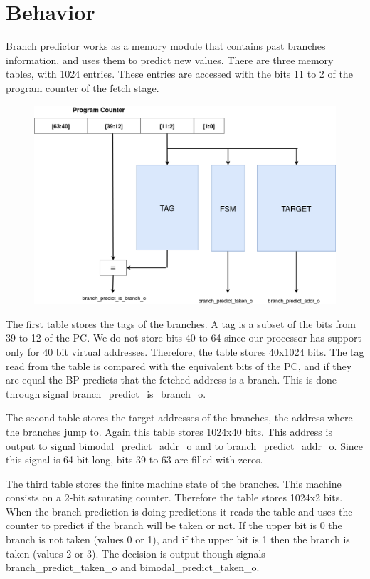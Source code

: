 \section{Behavior}

Branch predictor works as a memory module that contains past branches information, and uses them to predict new values. There are three memory tables, with 1024 entries. These entries are accessed with the bits 11 to 2 of the program counter of the fetch stage. 

\begin{figure}[h]
\centering
\includegraphics[width=1\linewidth]{branch_predictor.png}
\end{figure}

The first table stores the tags of the branches. A tag is a subset of the bits from 39 to 12 of the PC. We do not store bits 40 to 64 since our processor has support only for 40 bit virtual addresses. Therefore, the table stores 40x1024 bits. The tag read from the table is compared with the equivalent bits of the PC, and if they are equal the BP predicts that the fetched address is a branch. This is done through signal branch\_predict\_is\_branch\_o.

The second table stores the target addresses of the branches, the address where the branches jump to. Again this table stores 1024x40 bits. This address is output to signal bimodal\_predict\_addr\_o and to branch\_predict\_addr\_o. Since this signal is 64 bit long, bits 39 to 63 are filled with zeros.

The third table stores the finite machine state of the branches. This machine consists on a 2-bit saturating counter. Therefore the table stores 1024x2 bits. When the branch prediction is doing predictions it reads the table and uses the counter to predict if the branch will be taken or not. If the upper bit is 0 the branch is not taken (values 0 or 1), and if the upper bit is 1 then the branch is taken (values 2 or 3). The decision is output though signals branch\_predict\_taken\_o and bimodal\_predict\_taken\_o.


